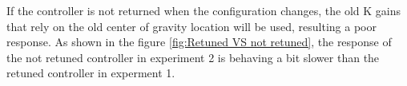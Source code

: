 If the controller is not returned when the configuration changes, the old K gains that rely on the old center of gravity location will be used, resulting a poor response. As shown in the figure \ref{fig:Retuned VS not retuned}, the response of the not retuned controller in experiment 2 is behaving a bit slower than the retuned controller in experment 1.
